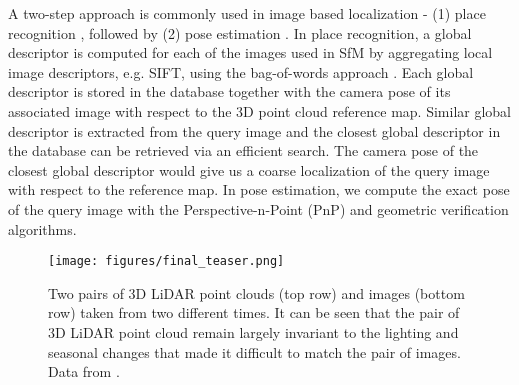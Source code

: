 \documentclass[10pt,twocolumn,letterpaper]{article}
\begin{document}
A two-step approach is commonly used in image based localization 
\cite{Sattler16CVPR,Sattler15ICCV,Sattler-2017,Zeisl15ICCV}
- (1) place recognition \cite{cummins:2010,Cummins:2008:FPL:1377516.1377517,Milford12ICRA,Akihiko:2015,GalvezTRO12}, followed by (2) pose estimation \cite{haralick1991pose}. In place recognition, a global descriptor is computed for each of the images used in SfM by aggregating local image descriptors, e.g. SIFT, using the bag-of-words approach \cite{Nister:2006,SivicZ03}.
Each global descriptor is stored in the database together with the camera pose of its associated image with respect to the 3D point cloud reference map. Similar global descriptor is extracted from the query image and the closest global descriptor in the database can be retrieved via an efficient search. The camera pose of the closest global descriptor would give us a coarse localization of the query image with respect to the reference map. 
In pose estimation, we compute the exact pose of the query image with the Perspective-n-Point (PnP) \cite{haralick1991pose} and geometric verification \cite{LeeP14} algorithms. 


\begin{figure}[t]
	\begin{center}
\texttt{[image: figures/final\_teaser.png]}
	\end{center}
	\vspace{-0.3cm}
	\caption{Two pairs of 3D LiDAR point clouds (top row) and images (bottom row) taken from two different times. It can be seen that the pair of 3D LiDAR point cloud remain largely invariant to the lighting and seasonal changes that made it difficult to match the pair of images. Data from \cite{RobotCarDatasetIJRR}.\vspace{-0.5cm}}
	\label{fig:CmpLidarImg}
\end{figure}
\end{document}
